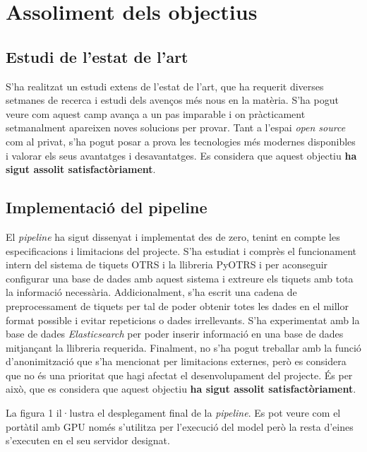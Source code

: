 \section{Assoliment dels objectius}

\subsection{Estudi de l'estat de l'art}
S'ha realitzat un estudi extens de l'estat de l'art, que ha requerit diverses setmanes de recerca i estudi dels avenços més nous en la matèria. S'ha pogut veure com aquest camp avança a un pas imparable i on pràcticament setmanalment apareixen noves solucions per provar. Tant a l'espai \textit{open source} com al privat, s'ha pogut posar a prova les tecnologies més modernes disponibles i valorar els seus avantatges i desavantatges. Es considera que aquest objectiu \textbf{ha sigut assolit satisfactòriament}.

\subsection{Implementació del pipeline}
El \textit{pipeline} ha sigut dissenyat i implementat des de zero, tenint en compte les especificacions i limitacions del projecte. S'ha estudiat i comprès el funcionament intern del sistema de tiquets OTRS i la llibreria PyOTRS i per aconseguir configurar una base de dades amb aquest sistema i extreure els tiquets amb tota la informació necessària. Addicionalment, s'ha escrit una cadena de preprocessament de tiquets per tal de poder obtenir totes les dades en el millor format possible i evitar repeticions o dades irrellevants. S'ha experimentat amb la base de dades \textit{Elasticsearch} per poder inserir informació en una base de dades mitjançant la llibreria requerida. Finalment, no s'ha pogut treballar amb la funció d'anonimització que s'ha mencionat per limitacions externes, però es considera que no és una prioritat que hagi afectat el desenvolupament del projecte. És per això, que es considera que aquest objectiu \textbf{ha sigut assolit satisfactòriament}.

La figura 1 il·lustra el desplegament final de la \textit{pipeline}. Es pot veure com el portàtil amb GPU només s'utilitza per l'execució del model però la resta d'eines s'executen en el seu servidor designat.

